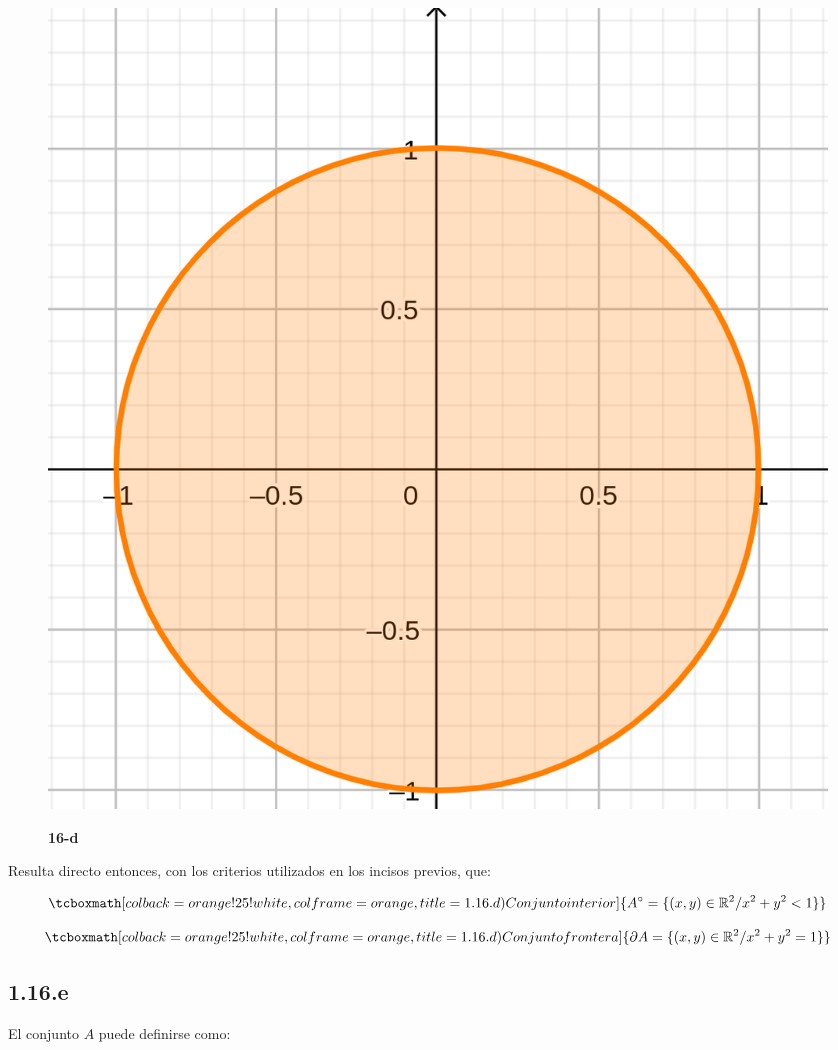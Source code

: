 \documentclass{article}
\renewcommand{\Bbb}{\mathbb}
\begin{document}
\begin{figure}[ht]
\caption{\textbf{16-d}}
\includegraphics[scale=2.5]{../img/exercises/guide_01/16_d.png} 
\centering
\label{fig:1-16-d}
\end{figure}

Resulta directo entonces, con los criterios utilizados en los incisos previos, que:

\begin{equation}
\tcboxmath[colback=orange!25!white,colframe=orange, title=1.16.d) Conjunto interior]
{ A^{\circ} = \{ (x, y) \in \Bbb R^2 / x^2 + y^2 < 1 \}  }
\end{equation}

\begin{equation}
\tcboxmath[colback=orange!25!white,colframe=orange, title=1.16.d) Conjunto frontera]
{ \partial{A} = \{ (x, y) \in \Bbb R^2 / x^2 + y^2 = 1 \} }
\end{equation}

\subsection*{1.16.e}
\label{subsec:1.16.e}

El conjunto $A$ puede definirse como:
\end{document}
